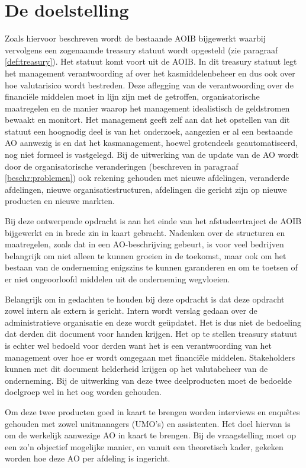 \documentclass[10pt,a4paper,oneside]{report}
\begin{document}
\section{De doelstelling}
Zoals hiervoor beschreven wordt de bestaande AOIB bijgewerkt waarbij vervolgens een zogenaamde treasury statuut wordt opgesteld (zie paragraaf \ref{def:treasury}). Het statuut komt voort uit de AOIB. In dit treasury statuut legt het management verantwoording af over het kasmiddelenbeheer en dus ook over hoe valutarisico wordt bestreden. Deze aflegging van de verantwoording over de financiële middelen moet in lijn zijn met de getroffen, organisatorische maatregelen en de manier waarop het management idealistisch de geldstromen bewaakt en monitort. Het management geeft zelf aan dat het opstellen van dit statuut een hoognodig deel is van het onderzoek, aangezien er al een bestaande AO aanwezig is en dat het kasmanagement, hoewel grotendeels geautomatiseerd, nog niet formeel is vastgelegd. Bij de uitwerking van de update van de AO wordt door de organisatorische veranderingen (beschreven in paragraaf \ref{beschr:problemen}) ook rekening gehouden met nieuwe afdelingen, veranderde afdelingen, nieuwe organisatiestructuren, afdelingen die gericht zijn op nieuwe producten en nieuwe markten.

Bij deze ontwerpende opdracht is aan het einde van het afstudeertraject de AOIB bijgewerkt en in brede zin in kaart gebracht. Nadenken over de structuren en maatregelen, zoals dat in een AO-beschrijving gebeurt, is voor veel bedrijven belangrijk om niet alleen te kunnen groeien in de toekomst, maar ook om het bestaan van de onderneming enigszins te kunnen garanderen en om te toetsen of er niet ongeoorloofd middelen uit de onderneming wegvloeien.

Belangrijk om in gedachten te houden bij deze opdracht is dat deze opdracht zowel intern als extern is gericht. Intern wordt verslag gedaan over de administratieve organisatie en deze wordt geüpdatet. Het is dus niet de bedoeling dat derden dit document voor handen krijgen. Het op te stellen treasury statuut is echter wel bedoeld voor derden want het is een verantwoording van het management over hoe er wordt omgegaan met financiële middelen. Stakeholders kunnen met dit document helderheid krijgen op het valutabeheer van de onderneming. Bij de uitwerking van deze twee deelproducten moet de bedoelde doelgroep wel in het oog worden gehouden.

Om deze twee producten goed in kaart te brengen worden interviews en enquêtes gehouden met zowel unitmanagers (UMO’s) en assistenten. Het doel hiervan is om de werkelijk aanwezige AO in kaart te brengen. Bij de vraagstelling moet op een zo’n objectief mogelijke manier, en vanuit een theoretisch kader, gekeken worden hoe deze AO per afdeling is ingericht.
\end{document}
